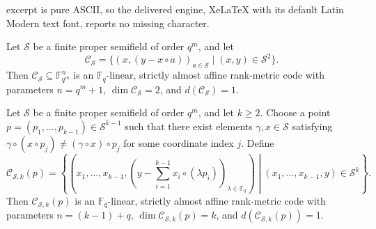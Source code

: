\documentclass[10pt,a4paper]{amsart}
\newcommand{\C}{\mathcal{C}}
\newcommand{\F}{\mathbb{F}}
\renewcommand{\S}{\mathcal{S}}
\begin{document}
excerpt is pure ASCII, so the delivered engine, XeLaTeX with its default Latin Modern text font, reports no missing character.
\begin{theorem}
Let $\S$ be a finite proper semifield of order $q^m$, and let $$\C_\S = \{ (x,(y-x\circ a))_{a\in \S}\mid (x,y)\in \S^2\}.$$ Then $\C_\S \subseteq \F_{q^m}^n$ is an $\F_q$-linear, strictly almost affine rank-metric code with parameters $n=q^m+1$, $\dim \C_\S = 2$, and $d(\C_\S)=1$. \label{thm:construction2dim}
\end{theorem}

\begin{theorem} Let $\S$ be a finite proper semifield of order $q^m$, and let $k\geq 2$. Choose a point $p =(p_1,\ldots,p_{k-1})\in \S^{k-1}$ such that there exist elements $\gamma,x\in \S$ satisfying $\gamma \circ (x\circ p_j) \neq (\gamma\circ x)\circ p_j$ for some coordinate index $j$. Define
\[
    \C_{\S,k}(p) = \left\{ \left(x_1,\ldots,x_{k-1},\left( y - \sum^{k-1}_{i=1}x_i \circ (\lambda p_i) \right)_{\lambda \in \F_q} \right) \middle| (x_1,\ldots,x_{k-1},y)\in \S^k \right\}.
\]
Then $\C_{\S,k}(p)$ is an $\F_q$-linear, strictly almost affine rank-metric code with parameters $n=(k-1)+q$, $\dim \C_{\S,k}(p) = k$, and $d(\C_{\S,k}(p)) = 1$. \label{thm:constructionkdim}
\end{theorem}
\end{document}
